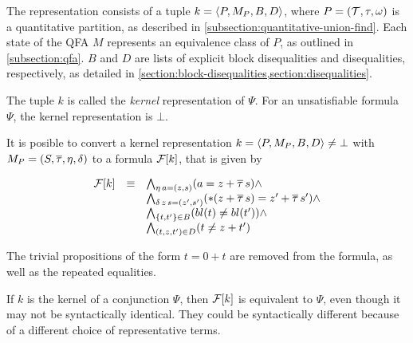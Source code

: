 The representation consists of a tuple $k = \langle P,M_P,B,D\rangle$,
where $P = (\mathcal{T}, \tau, \omega)$ is a quantitative partition, as described in \cref{subsection:quantitative-union-find}.
Each state of the QFA $M$ represents an equivalence class of $P$, as outlined in \cref{subsection:qfa}.
$B$ and $D$ are lists of explicit block disequalities and disequalities, respectively, as detailed in \cref{section:block-disequalities,section:disequalities}.

The tuple $k$ is called the \emph{kernel} representation of $\Psi$.
For an unsatisfiable formula $\Psi$, the kernel representation is $\bot$.

It is posible to convert a kernel representation $k = \langle P,M_P,B,D\rangle \neq \bot$ with $M_P = (S, \overline{\tau}, \eta, \delta)$ to a formula $\mathcal{F}[k]$, that is given by

\[
    \begin{array}{lll}
        \mathcal{F}[k] & \equiv & \bigwedge_{\eta\,a=(z,s)} (a = z + \overline{\tau}\,s) \land                        \\
              &        & \bigwedge_{\delta\,z\,s=(z',s')} (*(z + \overline{\tau}\,s) = z' + \overline{\tau}\,s') \land \\
              &        & \bigwedge_{\{t, t'\} \in B} (bl(t) \neq bl(t')) \land                     \\
              &        & \bigwedge_{(t, z, t') \in D} (t \neq z + t')
    \end{array}
\]

The trivial propositions of the form $t = 0 + t$ are removed from the formula, as well as the repeated equalities.

If $k$ is the kernel of a conjunction $\Psi$, then $\mathcal{F}[k]$ is equivalent to $\Psi$,
even though it may not be syntactically identical.
They could be syntactically different because of a different choice of representative terms.




